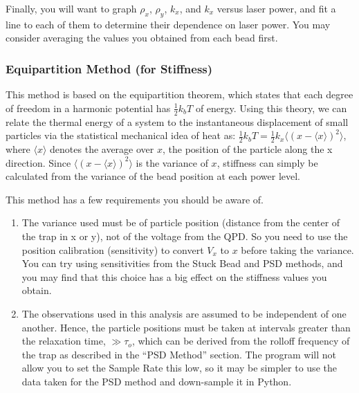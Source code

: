 \documentclass{../lab}
\begin{document}
Finally, you will want to graph $\rho_x$, $\rho_y$, $k_x$, and $k_x$ versus laser power, and fit a line to each of them to determine their dependence on laser power. You may consider averaging the values you obtained from each bead first.



\subsubsection{Equipartition Method (for Stiffness)}

This method is based on the equipartition theorem, which states that each degree of freedom in a harmonic potential has $\frac{1}{2}k_bT $ of energy. Using this theory, we can relate the thermal energy of a system to the instantaneous displacement of small particles via the statistical mechanical idea of heat as: $  \frac{1}{2}k_b T = \frac{1}{2}k_x \langle(x-\langle x\rangle)^2\rangle $, where $\langle x\rangle $ denotes the average over $x$, the position of the particle along the x direction. Since $\langle(x-\langle x\rangle)^2\rangle $ is the variance of $x$, stiffness can simply be calculated from the variance of the bead position at each power level.

This method has a few requirements you should be aware of.

\begin{enumerate}
    \item The variance used must be of particle position (distance from the center of the trap in x or y), not of the voltage from the QPD. So you need to use the position calibration (sensitivity) to convert $V_x$ to $x$ before taking the variance. You can try using sensitivities from the Stuck Bead and PSD methods, and you may find that this choice has a big effect on the stiffness values you obtain.

    \item The observations used in this analysis are assumed to be independent of one another. Hence, the particle positions must be taken at intervals greater than the relaxation time, $\gg \tau_o$, which can be derived from the rolloff frequency of the trap as described in the ``PSD Method'' section. The program will not allow you to set the Sample Rate this low, so it may be simpler to use the data taken for the PSD method and down-sample it in Python.

\end{enumerate}
\end{document}
